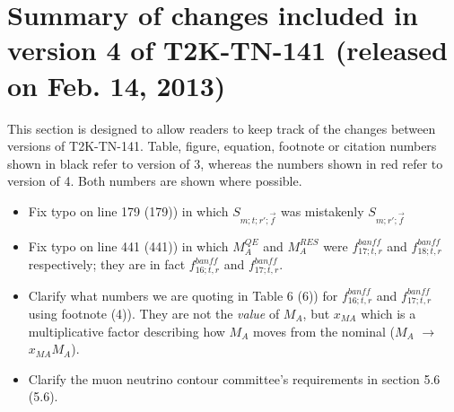 
\section{Summary of changes included in version 4 of T2K-TN-141 (released on Feb. 14, 2013)}

This section is designed to allow readers to keep track of the changes between versions of T2K-TN-141.
Table, figure, equation, footnote or citation numbers shown in black refer to version of 3,
{\color{red}whereas the numbers shown in red refer to version of 4}.
Both numbers are shown where possible.

\begin{itemize}

\item
Fix typo on line 179 {\color{red}(179)}) in which
$S_{m;t;r\prime;\vec{f}}$ was mistakenly $S_{m;r\prime;\vec{f}}$

\item
Fix typo on line 441 {\color{red}(441)}) in which $M_A^{QE}$ and
$M_A^{RES}$ were $f_{17; t, r}^{banff}$ and $f_{18; t, r}^{banff}$
respectively; they are in fact $f_{16; t, r}^{banff}$ and $f_{17; t,
  r}^{banff}$.

\item
Clarify what numbers we are quoting in Table 6 {\color{red}(6)}) for $f_{16; t, r}^{banff}$ and $f_{17; t,
  r}^{banff}$ using footnote {\color{red}(4)}). They are not the
\emph{value} of $M_A$, but $x_{MA}$ which is a multiplicative factor
describing how $M_A$ moves from the nominal ($M_A$ $\rightarrow$ $x_{MA} M_A$).

\item
Clarify the muon neutrino contour committee's requirements in section
5.6 {\color{red}(5.6)}.

\end{itemize}






